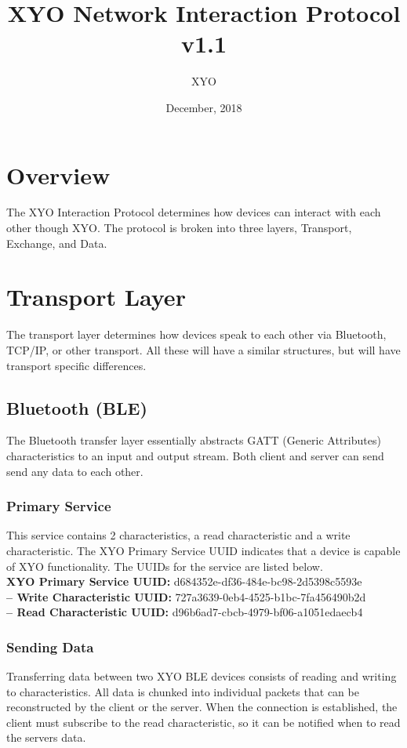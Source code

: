 \documentclass[11pt]{article}
\author{XYO}
\title{XYO Network Interaction Protocol v1.1}
\date{December, 2018}
\begin{document}
\maketitle

\section{Overview}
The XYO Interaction Protocol determines how devices can interact with each other though XYO.
The protocol is broken into three layers, Transport, Exchange, and Data.

\section{Transport Layer}
The transport layer determines how devices speak to each other via Bluetooth, TCP/IP,
or other transport. All these will have a similar structures, but will have transport
specific differences.

\subsection{Bluetooth (BLE)}
The Bluetooth transfer layer essentially abstracts GATT (Generic Attributes) characteristics to an input and output stream. Both client and server can send send any data to each other.

\subsubsection{Primary Service}
This service contains 2 characteristics, a read characteristic and a write characteristic. The XYO Primary Service UUID indicates that a device is capable of XYO functionality. The UUIDs for the service are listed below.\\

\noindent
\textbf{XYO Primary Service UUID:} d684352e-df36-484e-bc98-2d5398c5593e \\
\textbf{-- Write Characteristic UUID:} 727a3639-0eb4-4525-b1bc-7fa456490b2d \\
\textbf{-- Read Characteristic UUID:} d96b6ad7-cbcb-4979-bf06-a1051edaecb4 \\

\subsubsection{Sending Data}
Transferring data between two XYO BLE devices consists of reading and writing to characteristics. All data is chunked into individual packets that can be reconstructed by the client or the server. When the connection is established, the client must subscribe to the read characteristic, so it can be notified when to read the servers data. 
\end{document}
